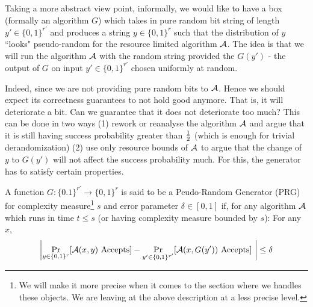 Taking a more abstract view point, informally, we would like to have a box (formally an algorithm $G$) which takes in pure random bit string of length $y' \in \{0,1\}^{r'}$ and produces a string $y \in \{0,1\}^r$ such that the distribution of $y$ ``looks" pseudo-random for the resource limited algorithm ${\cal{A}}$. The idea is that we will run the algorithm ${\cal{A}}$ with the random string provided the $G(y')$ - the output of $G$ on input $y' \in \{0,1\}^{r'}$ chosen uniformly at random. 

Indeed, since we are not providing pure random bits to ${\cal{A}}$. Hence we should expect its correctness guarantees to not hold good anymore. That is, it will deteriorate a bit. Can we guarantee that it does not deteriorate too much? This can be done in two ways (1) rework or reanalyse the algorithm ${\cal{A}}$ and argue that it is still having success probability greater than $\frac{1}{2}$ (which is enough for trivial derandomization) (2) use only resource bounds of ${\cal{A}}$ to argue that the change of $y$ to $G(y')$ will not affect the success probability much. For this, the generator has to satisfy certain properties.

A function $G : \{0.1\}^{r'} \to \{0,1\}^r$ is said to be a Peudo-Random Generator (PRG) for complexity measure\footnote{We will make it more precise when it comes to the section where we handles these objects. We are leaving at the above description at a less precise level.} $s$ and error parameter $\delta \in [0,1]$ if, for any algorithm ${\cal{A}}$ which runs in time $t \le s$ (or having complexity measure bounded by $s$): For any $x$,
$$\left|\Pr_{y \in \{0,1\}^r} [{\cal{A}}(x,y) \textrm{ Accepts}] - \Pr_{y' \in \{0,1\}^{r'}} [{\cal{A}}(x,G(y')) \textrm{ Accepts}]~\right| \le \delta$$

